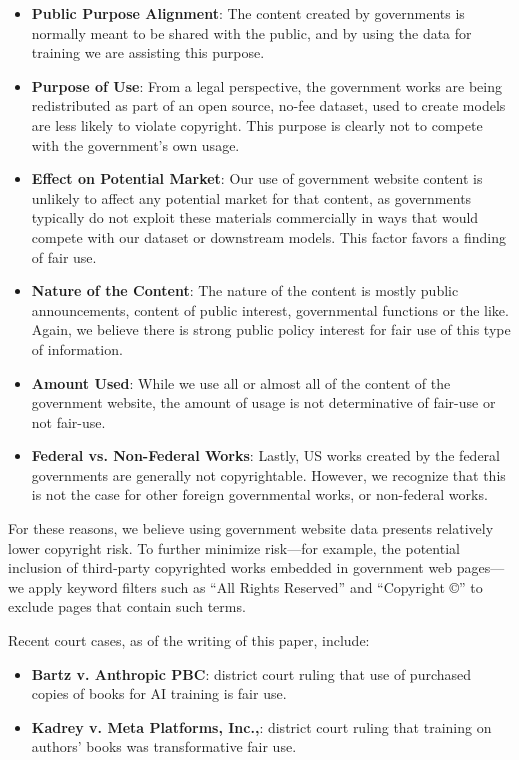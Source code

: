 \begin{itemize}
\item \textbf{Public Purpose Alignment}: The content created by governments is normally meant to be shared with the public, and by using the data for training we are assisting this purpose.

\item \textbf{Purpose of Use}: From a legal perspective, the government works are being redistributed as part of an open source, no-fee dataset, used to create models are less likely to violate copyright. This purpose is clearly not to compete with the government’s own usage.

\item \textbf{Effect on Potential Market}: Our use of government website content is unlikely to affect any potential market for that content, as governments typically do not exploit these materials commercially in ways that would compete with our dataset or downstream models. This factor favors a finding of fair use.

\item \textbf{Nature of the Content}: The nature of the content is mostly public announcements, content of public interest, governmental functions or the like. Again, we believe there is strong public policy interest for fair use of this type of information.

\item \textbf{Amount Used}: While we use all or almost all of the content of the government website, the amount of usage is not determinative of fair-use or not fair-use.

\item \textbf{Federal vs. Non-Federal Works}: Lastly, US works created by the federal governments are generally not copyrightable. However, we recognize that this is not the case for other foreign governmental works, or non-federal works.
\end{itemize}

For these reasons, we believe using government website data presents relatively lower copyright risk. To further minimize risk---for example, the potential inclusion of third‑party copyrighted works embedded in government web pages---we apply keyword filters such as “All Rights Reserved” and “Copyright ©” to exclude pages that contain such terms.

Recent court cases, as of the writing of this paper, include:
\begin{itemize}
    \item \textbf{Bartz v. Anthropic PBC}: district court ruling that use of purchased copies of books for AI training is fair use.
    \item \textbf{Kadrey v. Meta Platforms, Inc.,}: district court ruling that training on authors’ books was transformative fair use.
\end{itemize}
 
